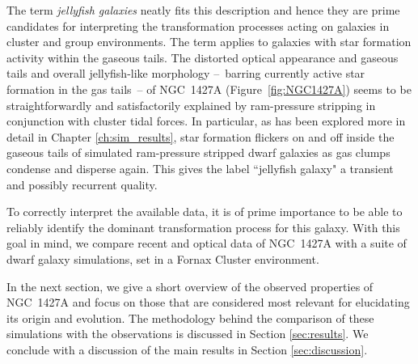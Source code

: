The term \emph{jellyfish galaxies} \citep{Ebeling2013} neatly fits this description and hence they are prime candidates for interpreting the transformation processes acting on galaxies in cluster and group environments.
The term applies to galaxies with star formation activity within the gaseous tails.
The distorted optical appearance and gaseous tails and overall jellyfish-like morphology --~barring currently active star formation in the gas tails~-- of NGC~1427A (Figure~\ref{fig:NGC1427A}) seems to be straightforwardly and satisfactorily explained by ram-pressure stripping in conjunction with cluster tidal forces.
In particular, as has been explored more in detail in Chapter \ref{ch:sim_results}, star formation flickers on and off inside the gaseous tails of simulated ram-pressure stripped dwarf galaxies as gas clumps condense and disperse again.
This gives the label ``jellyfish galaxy" a transient and possibly recurrent quality.

To correctly interpret the available data, it is of prime importance to be able to reliably identify the dominant transformation process for this galaxy.
With this goal in mind, we compare recent \Hi{} and optical data of NGC~1427A with a suite of dwarf galaxy simulations, set in a Fornax Cluster environment.

In the next section, we give a short overview of the observed properties of NGC~1427A and focus on those that are considered most relevant for elucidating its origin and evolution.
The methodology behind the comparison of these simulations with the observations is discussed in Section \ref{sec:results}.
We conclude with a discussion of the main results in Section \ref{sec:discussion}.


